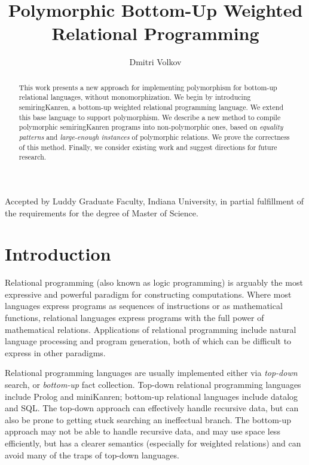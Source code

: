 \documentclass{report}
\title{Polymorphic Bottom-Up Weighted Relational Programming}
\author{Dmitri Volkov}
\theoremstyle{definition}
\begin{document}
\maketitle

\thispagestyle{empty}
\begin{center}
    Accepted by Luddy Graduate Faculty, Indiana University, in partial
    fulfillment of the requirements for the degree of Master of
    Science.
\end{center}
\vspace{5\baselineskip}
\setlength{\unitlength}{1pc}
\vspace{5\baselineskip}
\vspace{5\baselineskip}

\begin{abstract}
	This work presents a new approach for implementing polymorphism for bottom-up relational languages, without monomorphization.
	We begin by introducing semiringKanren, a bottom-up weighted relational programming language.
	We extend this base language to support polymorphism.
	We describe a new method to compile polymorphic semiringKanren programs into non-polymorphic ones, based on \emph{equality patterns} and \emph{large-enough instances} of polymorphic relations.
	We prove the correctness of this method.
	Finally, we consider existing work and suggest directions for future research.
\end{abstract}

\tableofcontents

\chapter{Introduction}

Relational programming (also known as logic programming) is arguably the most expressive and powerful paradigm for constructing computations.
Where most languages express programs as sequences of instructions or as mathematical functions, relational languages express programs with the full power of mathematical relations.
Applications of relational programming include natural language processing\cite{mooney1997} and program generation\cite{byrd2012}, both of which can be difficult to express in other paradigms.

Relational programming languages are usually implemented either via \emph{top-down} search, or \emph{bottom-up} fact collection.
Top-down relational programming languages include Prolog and miniKanren; bottom-up relational languages include datalog and SQL.
The top-down approach can effectively handle recursive data, but can also be prone to getting stuck searching an ineffectual branch.
The bottom-up approach may not be able to handle recursive data, and may use space less efficiently, but has a clearer semantics (especially for weighted relations) and can avoid many of the traps of top-down languages.
\end{document}
